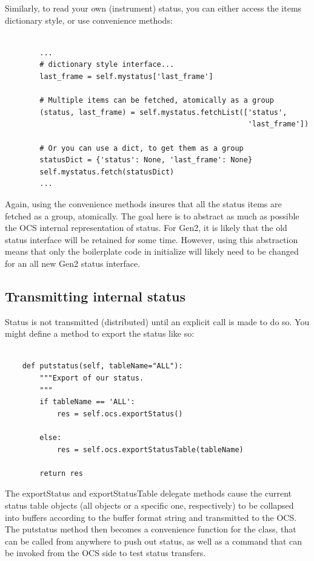 \documentclass[11pt]{report}
\begin{document}
Similarly, to read your own (instrument) status, you can either access
the items dictionary style, or use convenience methods: 
\begin{verbatim}

        ...
        # dictionary style interface...
        last_frame = self.mystatus['last_frame']

        # Multiple items can be fetched, atomically as a group
        (status, last_frame) = self.mystatus.fetchList(['status',
                                                        'last_frame'])

        # Or you can use a dict, to get them as a group
        statusDict = {'status': None, 'last_frame': None}
        self.mystatus.fetch(statusDict)
        ...

\end{verbatim}
Again, using the convenience methods insures that all the status items
are fetched as a group, atomically. The goal here is to abstract as much
as possible the OCS internal representation of status. For Gen2, it is
likely that the old status interface will be retained for some
time. However, using this abstraction means that only the boilerplate
code in initialize will likely need to be changed for an all new Gen2
status interface. 

\subsection{Transmitting internal status}
Status is not transmitted (distributed) until an explicit call is made
to do so. You might define a method to export the status like so: 
\begin{verbatim}

    def putstatus(self, tableName="ALL"):
        """Export of our status.
        """
        if tableName == 'ALL':
            res = self.ocs.exportStatus()

        else:
            res = self.ocs.exportStatusTable(tableName)

        return res

\end{verbatim}
The exportStatus and exportStatusTable delegate methods cause the
current status table objects (all objects or a specific one,
respectively) to be collapsed into buffers according to the buffer
format string and transmitted to the OCS. The putstatus method then
becomes a convenience function for the class, that can be called from
anywhere to push out status, as well as a command that can be invoked
from the OCS side to test status transfers. 
\end{document}
